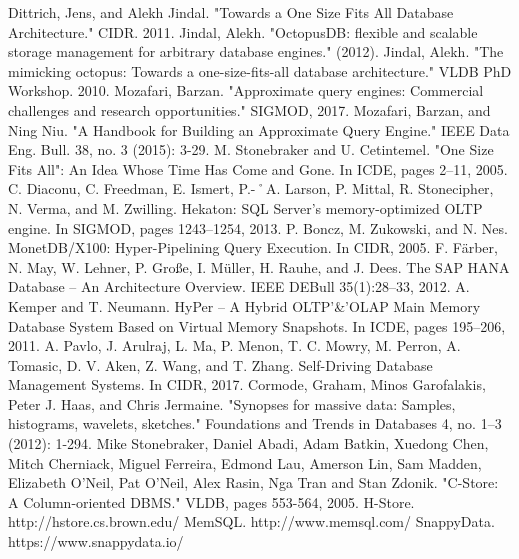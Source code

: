 \documentclass[10pt, conference, compsocconf]{IEEEtran}
\begin{document}
\begin{thebibliography}{1}

Dittrich, Jens, and Alekh Jindal. "Towards a One Size Fits All Database Architecture." CIDR. 2011.
Jindal, Alekh. "OctopusDB: flexible and scalable storage management for arbitrary database engines." (2012).
Jindal, Alekh. "The mimicking octopus: Towards a one-size-fits-all database architecture." VLDB PhD Workshop. 2010.
Mozafari, Barzan. "Approximate query engines: Commercial challenges and research opportunities." SIGMOD, 2017.
Mozafari, Barzan, and Ning Niu. "A Handbook for Building an Approximate Query Engine." IEEE Data Eng.
Bull. 38, no. 3 (2015): 3-29.
M. Stonebraker and U. Cetintemel. "One Size Fits All": An Idea Whose Time Has Come and Gone. In ICDE, pages 2–11, 2005.
C. Diaconu, C. Freedman, E. Ismert, P.-˚A. Larson, P. Mittal, R. Stonecipher, N. Verma, and M. Zwilling. Hekaton: SQL Server’s memory-optimized OLTP engine. In SIGMOD, pages 1243–1254, 2013.
P. Boncz, M. Zukowski, and N. Nes. MonetDB/X100: Hyper-Pipelining Query Execution. In CIDR, 2005.
F. Färber, N. May, W. Lehner, P. Große, I. Müller, H. Rauhe, and J. Dees. The SAP HANA Database – An Architecture Overview. IEEE DEBull 35(1):28–33, 2012.
A. Kemper and T. Neumann. HyPer – A Hybrid OLTP'\&'OLAP Main Memory Database System Based on Virtual Memory Snapshots. In ICDE, pages 195–206, 2011.
A. Pavlo, J. Arulraj, L. Ma, P. Menon, T. C. Mowry, M. Perron, A. Tomasic, D. V. Aken, Z. Wang, and T. Zhang. Self-Driving Database Management Systems. In CIDR, 2017.
Cormode, Graham, Minos Garofalakis, Peter J. Haas, and Chris Jermaine. "Synopses for massive data: Samples, histograms, wavelets, sketches." Foundations and Trends in Databases 4, no. 1–3 (2012): 1-294.
Mike Stonebraker, Daniel Abadi, Adam Batkin, Xuedong Chen, Mitch Cherniack, Miguel Ferreira, Edmond Lau, Amerson Lin, Sam Madden, Elizabeth O'Neil, Pat O'Neil, Alex Rasin, Nga Tran and Stan Zdonik. "C-Store: A Column-oriented DBMS." VLDB, pages 553-564, 2005. 
H-Store. http://hstore.cs.brown.edu/
MemSQL. http://www.memsql.com/
SnappyData. https://www.snappydata.io/
\end{thebibliography}
\end{document}
